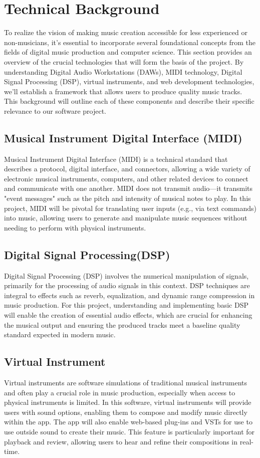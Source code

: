 \documentclass[10pt,twocolumn]{article}
\begin{document}
\section{Technical Background}
To realize the vision of making music creation accessible for less experienced or non-musicians, it's essential to incorporate several foundational concepts from the fields of digital music production and computer science. This section provides an overview of the crucial technologies that will form the basis of the project. By understanding Digital Audio Workstations (DAWs), MIDI technology, Digital Signal Processing (DSP), virtual instruments, and web development technologies, we'll establish a framework that allows users to produce quality music tracks. This background will outline each of these components and describe their specific relevance to our software project.
\subsection{Musical Instrument Digital Interface (MIDI)}
Musical Instrument Digital Interface (MIDI) is a technical standard that describes a protocol, digital interface, and connectors, allowing a wide variety of electronic musical instruments, computers, and other related devices to connect and communicate with one another. MIDI does not transmit audio—it transmits "event messages" such as the pitch and intensity of musical notes to play. In this project, MIDI will be pivotal for translating user inputs (e.g., via text commands) into music, allowing users to generate and manipulate music sequences without needing to perform with physical instruments.
\subsection{Digital Signal Processing(DSP)}
Digital Signal Processing (DSP) involves the numerical manipulation of signals, primarily for the processing of audio signals in this context. DSP techniques are integral to effects such as reverb, equalization, and dynamic range compression in music production. For this project, understanding and implementing basic DSP will enable the creation of essential audio effects, which are crucial for enhancing the musical output and ensuring the produced tracks meet a baseline quality standard expected in modern music.
\subsection{Virtual Instrument}
Virtual instruments are software simulations of traditional musical instruments and often play a crucial role in music production, especially when access to physical instruments is limited. In this software, virtual instruments will provide users with sound options, enabling them to compose and modify music directly within the app. The app will also enable web-based plug-ins and VSTs for use to use outside sound to create their music. This feature is particularly important for playback and review, allowing users to hear and refine their compositions in real-time.
\end{document}
